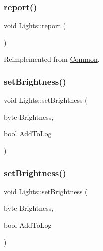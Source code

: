 \subsubsection{\texorpdfstring{report()}{report()}\hspace{0.1cm}{\footnotesize\ttfamily [2/2]}}
{\footnotesize\ttfamily void Lights\+::report (\begin{DoxyParamCaption}{ }\end{DoxyParamCaption})\hspace{0.3cm}{\ttfamily [virtual]}}



Reimplemented from \hyperlink{class_common_a9e60e2c26a5f4d72342a59a969954636}{Common}.

\mbox{\label{class_lights_a94b8cac76cd536d361b9b634511ac371}} 
\subsubsection{\texorpdfstring{set\+Brightness()}{setBrightness()}\hspace{0.1cm}{\footnotesize\ttfamily [1/2]}}
{\footnotesize\ttfamily void Lights\+::set\+Brightness (\begin{DoxyParamCaption}\item[{byte}]{Brightness,  }\item[{bool}]{Add\+To\+Log }\end{DoxyParamCaption})}

\mbox{\label{class_lights_a94b8cac76cd536d361b9b634511ac371}} 
\subsubsection{\texorpdfstring{set\+Brightness()}{setBrightness()}\hspace{0.1cm}{\footnotesize\ttfamily [2/2]}}
{\footnotesize\ttfamily void Lights\+::set\+Brightness (\begin{DoxyParamCaption}\item[{byte}]{Brightness,  }\item[{bool}]{Add\+To\+Log }\end{DoxyParamCaption})}




